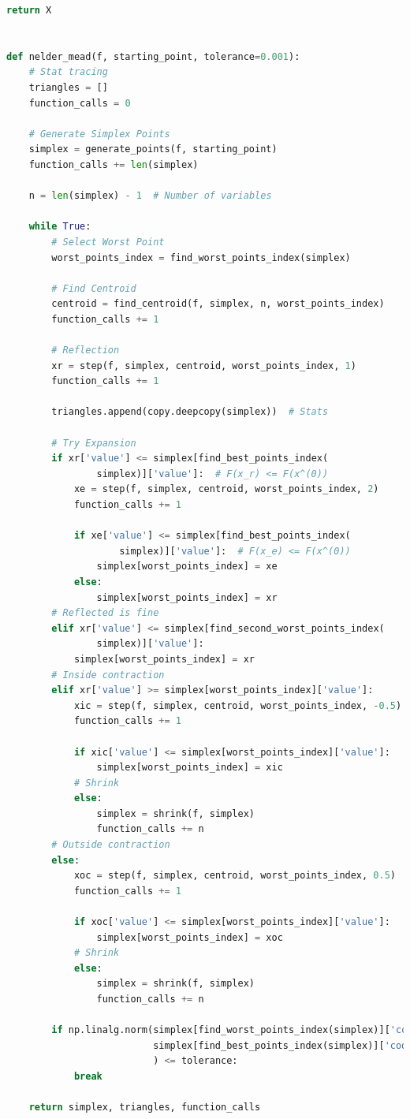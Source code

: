 \documentclass{VUMIFPSkursinis}
\begin{document}
\begin{lstlisting}[language=Python,caption={Deformuojamo simplekso algoritmo realizacija su Python},label={code:nm}]
    return X


def nelder_mead(f, starting_point, tolerance=0.001):
    # Stat tracing
    triangles = []
    function_calls = 0

    # Generate Simplex Points
    simplex = generate_points(f, starting_point)
    function_calls += len(simplex)

    n = len(simplex) - 1  # Number of variables

    while True:
        # Select Worst Point
        worst_points_index = find_worst_points_index(simplex)

        # Find Centroid
        centroid = find_centroid(f, simplex, n, worst_points_index)
        function_calls += 1

        # Reflection
        xr = step(f, simplex, centroid, worst_points_index, 1)
        function_calls += 1

        triangles.append(copy.deepcopy(simplex))  # Stats

        # Try Expansion
        if xr['value'] <= simplex[find_best_points_index(
                simplex)]['value']:  # F(x_r) <= F(x^(0))
            xe = step(f, simplex, centroid, worst_points_index, 2)
            function_calls += 1

            if xe['value'] <= simplex[find_best_points_index(
                    simplex)]['value']:  # F(x_e) <= F(x^(0))
                simplex[worst_points_index] = xe
            else:
                simplex[worst_points_index] = xr
        # Reflected is fine
        elif xr['value'] <= simplex[find_second_worst_points_index(
                simplex)]['value']:
            simplex[worst_points_index] = xr
        # Inside contraction
        elif xr['value'] >= simplex[worst_points_index]['value']:
            xic = step(f, simplex, centroid, worst_points_index, -0.5)
            function_calls += 1

            if xic['value'] <= simplex[worst_points_index]['value']:
                simplex[worst_points_index] = xic
            # Shrink
            else:
                simplex = shrink(f, simplex)
                function_calls += n
        # Outside contraction
        else:
            xoc = step(f, simplex, centroid, worst_points_index, 0.5)
            function_calls += 1

            if xoc['value'] <= simplex[worst_points_index]['value']:
                simplex[worst_points_index] = xoc
            # Shrink
            else:
                simplex = shrink(f, simplex)
                function_calls += n

        if np.linalg.norm(simplex[find_worst_points_index(simplex)]['coords'] -
                          simplex[find_best_points_index(simplex)]['coords']
                          ) <= tolerance:
            break

    return simplex, triangles, function_calls
\end{lstlisting}
\end{document}
